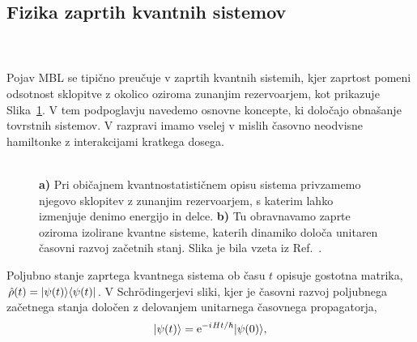 \subsection{Fizika zaprtih kvantnih sistemov}
\begin{minipage}[t]{0.4\textwidth}
\noindent \\\\
Pojav MBL se tipično preučuje v zaprtih kvantnih sistemih, kjer zaprtost pomeni odsotnost sklopitve z okolico oziroma zunanjim rezervoarjem, kot prikazuje Slika~\ref{fig:nandkishore_huse_reservoir}. V tem podpoglavju navedemo osnovne koncepte, ki določajo obnašanje tovrstnih sistemov. V razpravi imamo vselej v mislih časovno neodvisne hamiltonke z interakcijami kratkega dosega. \\\\
\end{minipage}\hfill
\begin{minipage}[t]{0.55\textwidth}
\begin{figure}[H]
\caption{
\textbf{a)} Pri običajnem kvantnostatističnem opisu sistema privzamemo njegovo sklopitev z zunanjim rezervoarjem, s katerim lahko izmenjuje denimo energijo in delce. \textbf{b)} Tu obravnavamo zaprte oziroma izolirane kvantne sisteme, katerih dinamiko določa unitaren časovni razvoj začetnih stanj. 
Slika je bila vzeta iz Ref.~\cite{nandkishore2015many}. 
}
\label{fig:nandkishore_huse_reservoir}
\end{figure}
\end{minipage}
Poljubno stanje zaprtega kvantnega sistema ob času $t$ opisuje gostotna matrika, $\hat{\rho}(t)=\vert\psi(t)\rangle\langle \psi(t) \vert$. 
V Schrödingerjevi sliki, kjer je časovni razvoj poljubnega začetnega 
 stanja določen z delovanjem unitarnega časovnega propagatorja, 
\begin{equation}\label{eq:cas_razvoj}
\vert\psi(t)\rangle=\mathrm{e}^{-{i\mkern1mu} H t/\hbar}\vert\psi(0)\rangle,
\end{equation}
